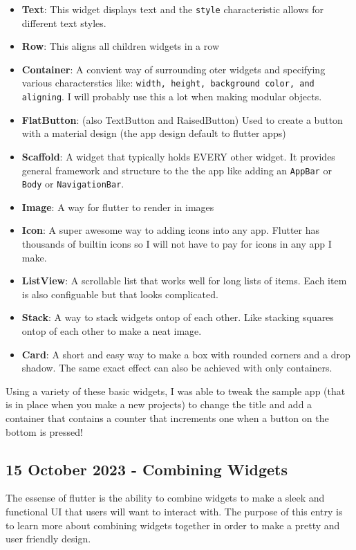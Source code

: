 \documentclass{article}
\begin{document}
\begin{itemize}
	\item \textbf{Text}: This widget displays text and the \texttt{style} characteristic allows for different text styles.
	\item \textbf{Row}: This aligns all children widgets in a row
	\item \textbf{Container}: A convient way of surrounding oter widgets and specifying various characterstics like: \texttt{width, height, background color, and aligning}. I will probably use this a lot when making modular objects.
	\item \textbf{FlatButton}: (also TextButton and RaisedButton) Used to create a button with a material design (the app design default to flutter apps)
	\item \textbf{Scaffold}: A widget that typically holds EVERY other widget. It provides general framework and structure to the the app like adding an \texttt{AppBar} or \texttt{Body} or \texttt{NavigationBar}.
	\item \textbf{Image}: A way for flutter to render in images
	\item \textbf{Icon}: A super awesome way to adding icons into any app. Flutter has thousands of builtin icons so I will not have to pay for icons in any app I make.
	\item \textbf{ListView}: A scrollable list that works well for long lists of items. Each item is also configuable but that looks complicated.
	\item \textbf{Stack}: A way to stack widgets ontop of each other. Like stacking squares ontop of each other to make a neat image.
	\item \textbf{Card}: A short and easy way to make a box with rounded corners and a drop shadow. The same exact effect can also be achieved with only containers.
\end{itemize}

Using a variety of these basic widgets, I was able to tweak the sample app (that is in place when you make a new projects) to change the title and add a container that contains a counter that increments one when a button on the bottom is pressed!



\newpage
\subsection{15 October 2023 - Combining Widgets}

The essense of flutter is the ability to combine widgets to make a sleek and functional UI that users will want to interact with. The purpose of this entry is to learn more about combining widgets together in order to make a pretty and user friendly design.
\end{document}
